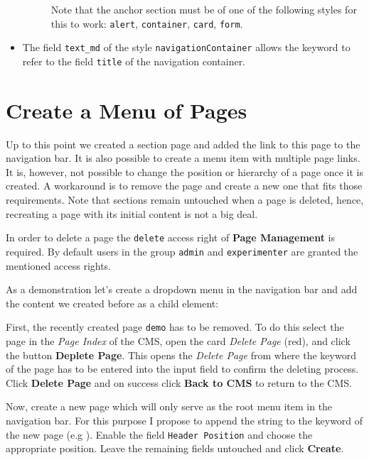 \documentclass[a4paper,oneside]{book}
\begin{document}
\begin{itemize}
\begin{description}
                Note that the anchor section must be of one of the following styles for this to work: \texttt{alert}, \texttt{container}, \texttt{card}, \texttt{form}.
        \end{description}
    \item The field \texttt{text\_md} of the style \texttt{navigationContainer} allows the keyword  to refer to the field \texttt{title} of the navigation container.
\end{itemize}

\section{Create a Menu of Pages}
Up to this point we created a section page and added the link to this page to the navigation bar.
It is also possible to create a menu item with multiple page links.
It is, however, not possible to change the position or hierarchy of a page once it is created.
A workaround is to remove the page and create a new one that fits those requirements.
Note that sections remain untouched when a page is deleted, hence, recreating a page with its initial content is not a big deal.

In order to delete a page the \texttt{delete} access right of \textbf{Page Management} is required.
By default users in the group \texttt{admin} and \texttt{experimenter} are granted the mentioned access rights.

As a demonstration let's create a dropdown menu in the navigation bar and add the content we created before as a child element:

First, the recently created page \texttt{demo} has to be removed.
To do this select the page in the \emph{Page Index} of the CMS, open the card \emph{Delete Page} (red), and click the button \textbf{Deplete Page}.
This opens the \emph{Delete Page} from where the keyword of the page has to be entered into the input field to confirm the deleting process.
Click \textbf{Delete Page} and on success click \textbf{Back to CMS} to return to the CMS.

Now, create a new page which will only serve as the root menu item in the navigation bar.
For this purpose I propose to append the string  to the keyword of the new page (e.g ).
Enable the field \texttt{Header Position} and choose the appropriate position.
Leave the remaining fields untouched and click \textbf{Create}.
\end{document}
